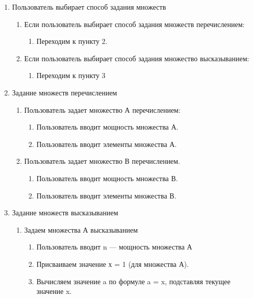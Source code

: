 \documentclass[a4paper,12pt]{extarticle}
\begin{document}
\begin{enumerate}
  \item Пользователь выбирает способ задания множеств
  \begin{enumerate}[label*=\arabic*.]
    \item Если пользователь выбирает способ задания множеств перечислением:
    \begin{enumerate}[label*=\arabic*.]
      \item Переходим к пункту 2.
    \end{enumerate}
    \item Если пользователь выбирает способ задания множество высказыванием:
    \begin{enumerate}[label*=\arabic*.]
      \item Переходим к пункту 3
    \end{enumerate}
  \end{enumerate}
  \item Задание множеств перечислением
  \begin{enumerate}[label*=\arabic*.]
    \item Пользователь задает множество А перечислением:
    \begin{enumerate}[label*=\arabic*.]
      \item Пользователь вводит мощность множества А.
      \item Пользователь вводит элементы множества А.
    \end{enumerate}
    \item Пользователь задает множество В перечислением.
    \begin{enumerate}[label*=\arabic*.]
      \item Пользователь вводит мощность множества В.
      \item Пользователь вводит элементы множества В.
    \end{enumerate}
  \end{enumerate}
  \item Задание множеств высказыванием
  \begin{enumerate}[label*=\arabic*.]
    \item Задаем множества А высказыванием
    \begin{enumerate}[label*=\arabic*.]
      \item Пользователь вводит n — мощность множества А
      \item Присваиваем значение х = 1 (для множества А).
      \item Вычисляем значение a по формуле a = x, подставляя текущее значение x.

\end{enumerate}
\end{enumerate}
\end{enumerate}
\end{document}
